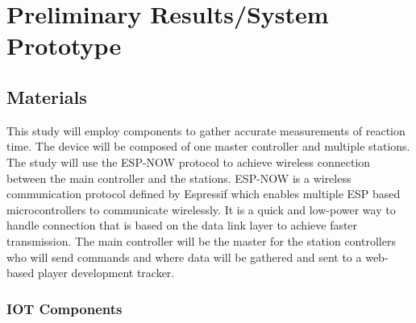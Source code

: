 \chapter{Preliminary Results/System Prototype}

\section{Materials}
This study will employ components to gather accurate measurements of reaction time. The device will be composed of one master controller and multiple stations. The study will use the ESP-NOW protocol to achieve wireless connection between the main controller and the stations. ESP-NOW is a wireless communication protocol defined by Espressif which enables multiple ESP based microcontrollers to communicate wirelessly. It is a quick and low-power way to handle connection that is based on the data link layer to achieve faster transmission. The main controller will be the master for the station controllers who will send commands and where data will be gathered and sent to a web-based player development tracker.

\subsection{IOT Components}




